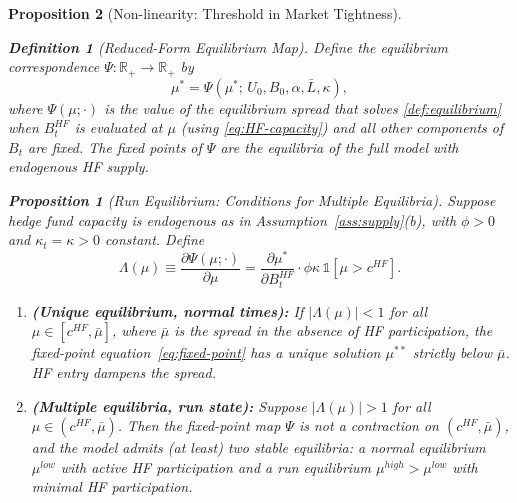 \documentclass[12pt]{article}
\newtheorem{proposition}{Proposition}
\newtheorem{definition}{Definition}
\theoremstyle{definition}
\newcommand{\1}[1]{\mathds{1}\left[#1\right]}
\newcommand{\R}{\mathbb{R}}
\begin{document}
\begin{proposition}[Non-linearity: Threshold in Market Tightness]
\begin{definition}[Reduced-Form Equilibrium Map]
  \label{def:eqmap}
  Define the \emph{equilibrium correspondence} $\Psi\colon \R_{+} \to \R_{+}$
  by
  \begin{equation}
    \mu^* = \Psi(\mu^*;\, U_0, B_0, \alpha, \bar{L}, \kappa),
    \label{eq:fixed-point}
  \end{equation}
  where $\Psi(\mu; \cdot)$ is the value of the equilibrium spread that solves
  \cref{def:equilibrium} when $B_t^{HF}$ is evaluated at $\mu$ (using
  \eqref{eq:HF-capacity}) and all other components of $B_t$ are fixed. The
  fixed points of $\Psi$ are the equilibria of the full model with endogenous
  HF supply.
\end{definition}

\begin{proposition}[Run Equilibrium: Conditions for Multiple Equilibria]
  \label{prop:run}
  Suppose hedge fund capacity is endogenous as in Assumption~\ref{ass:supply}(b),
  with $\phi > 0$ and $\kappa_t = \kappa > 0$ constant. Define
  \[
    \Lambda(\mu) \equiv \frac{\partial\Psi(\mu;\cdot)}{\partial\mu}
    = \frac{\partial\mu^*}{\partial B_t^{HF}}
      \cdot \phi\kappa\,\mathds{1}[\mu > c^{HF}].
  \]
  \begin{enumerate}[label=(\alph*)]
    \item \textbf{(Unique equilibrium, normal times):} If $|\Lambda(\mu)| < 1$
    for all $\mu \in [c^{HF}, \bar\mu]$, where $\bar\mu$ is the spread in
    the absence of HF participation, the fixed-point equation~\eqref{eq:fixed-point}
    has a unique solution $\mu^{**}$ strictly below $\bar\mu$. HF entry
    dampens the spread.

    \item \textbf{(Multiple equilibria, run state):} Suppose
    $|\Lambda(\mu)| > 1$ for all $\mu \in (c^{HF}, \bar\mu)$. Then the
    fixed-point map $\Psi$ is not a contraction on $(c^{HF}, \bar\mu)$,
    and the model admits (at least) two stable equilibria: a \emph{normal
    equilibrium} $\mu^{low}$ with active HF participation and a \emph{run
    equilibrium} $\mu^{high} > \mu^{low}$ with minimal HF participation.


\end{enumerate}
\end{proposition}
\end{proposition}
\end{document}
